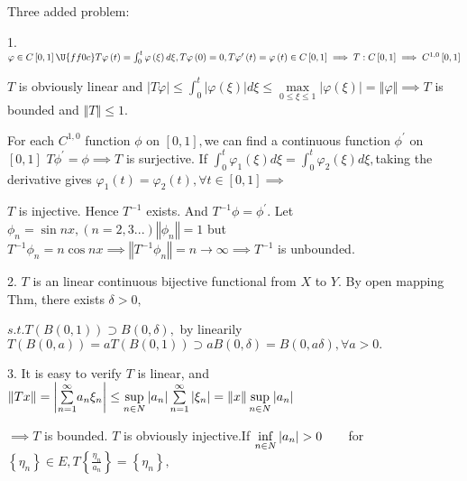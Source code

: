 \documentclass{article}
\begin{document}
Three added problem:

1.$\varphi \in C\left[ 0,1\right] \U{ff0c} T\varphi \left( t\right)
=\int_{0}^{t}\varphi \left( \xi \right) d\xi ,T\varphi \left( 0\right)
=0,T\varphi ^{\prime }\left( t\right) =\varphi \left( t\right) \in C\left[
0,1\right] \implies T:C\left[ 0,1\right] \implies C^{1,0}\left[ 0,1\right] $

$T$ is obviously linear and $\left\vert T\varphi \right\vert \leq
\int_{0}^{t}\left\vert \varphi \left( \xi \right) \right\vert d\xi \leq 
\underset{0\leq \xi \leq 1}{\max }\left\vert \varphi \left( \xi \right)
\right\vert =\left\Vert \varphi \right\Vert \implies T$ is bounded and $%
\left\Vert T\right\Vert \leq 1.$

For each $C^{1,0}$ function $\phi $ on $\left[ 0,1\right] ,$we can find a
continuous function $\phi ^{\prime }$ on $\left[ 0,1\right] $  $T\phi
^{\prime }=\phi \implies T$ is surjective. If $\int_{0}^{t}\varphi
_{1}\left( \xi \right) d\xi =\int_{0}^{t}\varphi _{2}\left( \xi \right) d\xi
,$taking the derivative gives $\varphi _{1}\left( t\right) =\varphi
_{2}\left( t\right) ,\forall t\in \left[ 0,1\right] \implies $

$T$ is injective. Hence $T^{-1}$ exists. And $T^{-1}\phi =\phi ^{\prime }.$%
Let $\phi _{n}=\sin nx,\left( n=2,3...\right) \left\Vert \phi
_{n}\right\Vert =1$ but $T^{-1}\phi _{n}=n\cos nx\implies \left\Vert
T^{-1}\phi _{n}\right\Vert =n\rightarrow \infty \implies T^{-1}$ is
unbounded.

2. $T$ is an linear continuous bijective functional from $X$ to $Y.$ By open
mapping Thm, there exists $\delta >0,$

$s.t.T\left( B\left( 0,1\right) \right) \supset B\left( 0,\delta \right) ,$
by linearily $T\left( B\left( 0,a\right) \right) =aT\left( B\left(
0,1\right) \right) \supset aB\left( 0,\delta \right) =B\left( 0,a\delta
\right) ,\forall a>0.$

3. It is easy to verify $T$ is linear, and $\left\Vert Tx\right\Vert
=\left\vert \underset{n=1}{\overset{\infty }{\sum }}a_{n}\xi _{n}\right\vert
\leq \underset{n\in N}{\sup }\left\vert a_{n}\right\vert \underset{n=1}{%
\overset{\infty }{\sum }}\left\vert \xi _{n}\right\vert =\left\Vert
x\right\Vert \underset{n\in N}{\sup }\left\vert a_{n}\right\vert $

$\implies T$ is bounded. $T$ is obviously injective.If $\underset{n\in N}{%
\inf }\left\vert a_{n}\right\vert >0\qquad $for $\left\{ \eta _{n}\right\}
\in E,T\left\{ \frac{\eta _{n}}{a_{n}}\right\} =\left\{ \eta _{n}\right\} ,$
\end{document}
